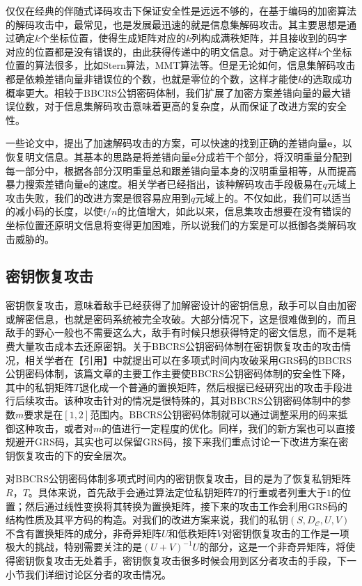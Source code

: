 仅仅在经典的伴随式译码攻击下保证安全性是远远不够的，在基于编码的加密算法的解码攻击中，最常见，也是发展最迅速的就是信息集解码攻击。其主要思想是通过确定$k$个坐标位置，使得生成矩阵对应的$k$列构成满秩矩阵，并且接收到的码字对应的位置都是没有错误的，由此获得传递中的明文信息。对于确定这样$k$个坐标位置的算法很多，比如Stern算法，MMT算法等。但是无论如何，信息集解码攻击都是依赖差错向量非错误位的个数，也就是零位的个数，这样才能使$k$的选取成功概率更大。相较于BBCRS公钥密码体制，我们扩展了加密方案差错向量的最大错误位数，对于信息集解码攻击意味着更高的复杂度，从而保证了改进方案的安全性。

一些论文中，提出了加速解码攻击的方案，可以快速的找到正确的差错向量$\mathbf{e}$，以恢复明文信息。其基本的思路是将差错向量$\mathbf{e}$分成若干个部分，将汉明重量分配到每一部分中，根据各部分汉明重量总和跟差错向量本身的汉明重量相等，从而提高暴力搜索差错向量$\mathbf{e}$的速度。相关学者已经指出，该种解码攻击手段极易在$q$元域上攻击失败，我们的改进方案是很容易应用到$q$元域上的。不仅如此，我们可以适当的减小码的长度，以使$t/n$的比值增大，如此以来，信息集攻击想要在没有错误的坐标位置还原明文信息将变得更加困难，所以说我们的方案是可以抵御各类解码攻击威胁的。

\subsection{密钥恢复攻击}
密钥恢复攻击，意味着敌手已经获得了加解密设计的密钥信息，敌手可以自由加密或解密信息，也就是密码系统被完全攻破。大部分情况下，这是很难做到的，而且敌手的野心一般也不需要这么大，敌手有时候只想获得特定的密文信息，而不是耗费大量攻击成本去还原密钥。关于BBCRS公钥密码体制在密钥恢复攻击的攻击情况，相关学者在【引用】中就提出可以在多项式时间内攻破采用GRS码的BBCRS公钥密码体制，该篇文章的主要工作主要使BBCRS公钥密码体制的安全性下降，其中的私钥矩阵$T$退化成一个普通的置换矩阵，然后根据已经研究出的攻击手段进行后续攻击。该种攻击针对的情况是很特殊的，其对BBCRS公钥密码体制中的参数$m$要求是在$[1, 2]$范围内。BBCRS公钥密码体制就可以通过调整采用的码来抵御这种攻击，或者对$m$的值进行一定程度的优化。同样，我们的新方案也可以直接规避开GRS码，其实也可以保留GRS码，接下来我们重点讨论一下改进方案在密钥恢复攻击的下的安全层次。

对BBCRS公钥密码体制多项式时间内的密钥恢复攻击，目的是为了恢复私钥矩阵$R$，$T$。具体来说，首先敌手会通过算法定位私钥矩阵$T$的行重或者列重大于$1$的位置；然后通过线性变换将其转换为置换矩阵，接下来的攻击工作会利用GRS码的结构性质及其平方码的构造。对我们的改进方案来说，我们的私钥$(S,D_\mathcal{C},U,V)$不含有置换矩阵的成分，非奇异矩阵$U$和低秩矩阵$V$对密钥恢复攻击的工作是一项极大的挑战，特别需要关注的是$(U+V)^{-1}U$的部分，这是一个非奇异矩阵，将使得密钥恢复攻击无处着手，密钥恢复攻击很多时候会用到区分者攻击的手段，下一小节我们详细讨论区分者的攻击情况。

